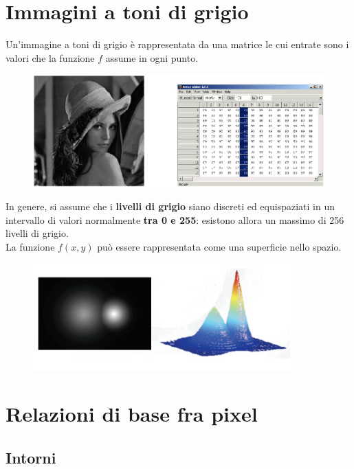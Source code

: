 \section{Immagini a toni di grigio}

Un'immagine a toni di grigio è rappresentata da una matrice le cui
entrate sono i valori che la funzione $f$ assume in ogni punto.

\begin{figure}[H]
    \centering
    \includegraphics[width=12cm, keepaspectratio]{capitoli/immagini/imgs/rappresentazione_immagine_toni_grigio.jpg}
\end{figure}

In genere, si assume che i \textbf{livelli di grigio} siano discreti ed
equispaziati in un intervallo di valori normalmente \textbf{tra 0 e 255}:
esistono allora un massimo di 256 livelli di grigio.
\\
La funzione $f (x , y)$ può essere rappresentata come una superficie
nello spazio.

\begin{figure}[H]
    \centering
    \includegraphics[width=10cm, keepaspectratio]{capitoli/immagini/imgs/funzione_toni_grigio.jpg}
\end{figure}

\section{Relazioni di base fra pixel}

\subsection{Intorni}

